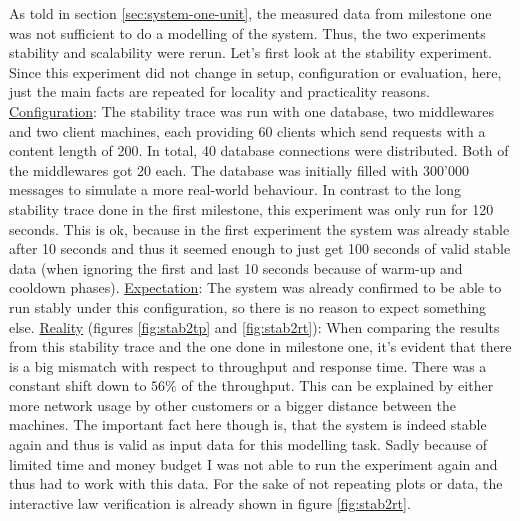 \documentclass[11pt]{article}
\begin{document}
As told in section \ref{sec:system-one-unit}, the measured data from milestone one was not sufficient to do a modelling of the system. Thus, the two experiments stability and scalability were rerun. Let's first look at the stability experiment. Since this experiment did not change in setup, configuration or evaluation, here, just the main facts are repeated for locality and practicality reasons.
\newline\underline{Configuration}: The stability trace was run with one database, two middlewares and two client machines, each providing 60 clients which send requests with a content length of 200. In total, 40 database connections were distributed. Both of the middlewares got 20 each. The database was initially filled with 300'000 messages to simulate a more real-world behaviour. In contrast to the long stability trace done in the first milestone, this experiment was only run for 120 seconds. This is ok, because in the first experiment the system was already stable after 10 seconds and thus it seemed enough to just get 100 seconds of valid stable data (when ignoring the first and last 10 seconds because of warm-up and cooldown phases).
\newline\underline{Expectation}: The system was already confirmed to be able to run stably under this configuration, so there is no reason to expect something else.
\newline\underline{Reality} (figures \ref{fig:stab2tp} and \ref{fig:stab2rt}): When comparing the results from this stability trace and the one done in milestone one, it's evident that there is a big mismatch with respect to throughput and response time. There was a constant shift down to $56\%$ of the throughput. This can be explained by either more network usage by other customers or a bigger distance between the machines. The important fact here though is, that the system is indeed stable again and thus is valid as input data for this modelling task. Sadly because of limited time and money budget I was not able to run the experiment again and thus had to work with this data. For the sake of not repeating plots or data, the interactive law verification is already shown in figure \ref{fig:stab2rt}.
\end{document}
